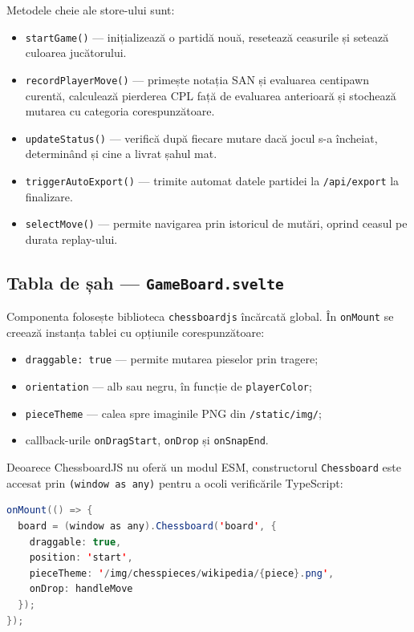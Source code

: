 \documentclass[12pt,a4paper]{article}
\begin{document}
Metodele cheie ale store-ului sunt:
\begin{itemize}
  \item \texttt{startGame()} — inițializează o partidă nouă, resetează ceasurile și setează culoarea jucătorului.
  \item \texttt{recordPlayerMove()} — primește notația SAN și evaluarea centipawn curentă, calculează pierderea CPL față de evaluarea anterioară și stochează mutarea cu categoria corespunzătoare.
  \item \texttt{updateStatus()} — verifică după fiecare mutare dacă jocul s-a încheiat, determinând și cine a livrat șahul mat.
  \item \texttt{triggerAutoExport()} — trimite automat datele partidei la \texttt{/api/export} la finalizare.
  \item \texttt{selectMove()} — permite navigarea prin istoricul de mutări, oprind ceasul pe durata replay-ului.
\end{itemize}

\subsection{Tabla de șah — \texttt{GameBoard.svelte}}

Componenta folosește biblioteca \texttt{chessboardjs} încărcată global. În \texttt{onMount} se creează instanța tablei cu opțiunile corespunzătoare:
\begin{itemize}
  \item \texttt{draggable: true} — permite mutarea pieselor prin tragere;
  \item \texttt{orientation} — alb sau negru, în funcție de \texttt{playerColor};
  \item \texttt{pieceTheme} — calea spre imaginile PNG din \texttt{/static/img/};
  \item callback-urile \texttt{onDragStart}, \texttt{onDrop} și \texttt{onSnapEnd}.
\end{itemize}

Deoarece ChessboardJS nu oferă un modul ESM, constructorul \texttt{Chessboard} este accesat prin \texttt{(window as any)} pentru a ocoli verificările TypeScript:

\begin{lstlisting}[language=Java, caption={Instanțierea tablei în GameBoard.svelte}]
onMount(() => {
  board = (window as any).Chessboard('board', {
    draggable: true,
    position: 'start',
    pieceTheme: '/img/chesspieces/wikipedia/{piece}.png',
    onDrop: handleMove
  });
});
\end{lstlisting}
\end{document}
